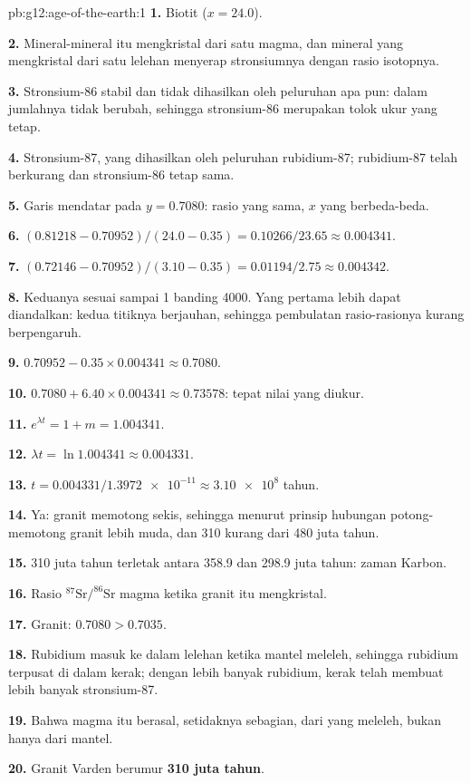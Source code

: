 \begin{solution}{pb:g12:age-of-the-earth:1}
\textbf{1.} Biotit ($x = 24.0$).

\textbf{2.} Mineral-mineral itu mengkristal dari satu magma, dan mineral yang
mengkristal dari satu lelehan menyerap stronsiumnya dengan rasio isotopnya.

\textbf{3.} Stronsium-86 stabil dan tidak dihasilkan oleh peluruhan apa pun:
dalam  jumlahnya tidak berubah, sehingga stronsium-86 merupakan
tolok ukur yang tetap.

\textbf{4.} Stronsium-87, yang dihasilkan oleh peluruhan rubidium-87;
rubidium-87 telah berkurang dan stronsium-86 tetap sama.

\textbf{5.} Garis mendatar pada $y = 0.7080$: rasio yang sama, $x$ yang
berbeda-beda.

\textbf{6.} $(0.81218 - 0.70952)/(24.0 - 0.35) = 0.10266/23.65 \approx
0.004341$.

\textbf{7.} $(0.72146 - 0.70952)/(3.10 - 0.35) = 0.01194/2.75 \approx
0.004342$.

\textbf{8.} Keduanya sesuai sampai 1 banding 4000. Yang pertama lebih dapat
diandalkan: kedua titiknya berjauhan, sehingga pembulatan rasio-rasionya kurang
berpengaruh.

\textbf{9.} $0.70952 - 0.35 \times 0.004341 \approx 0.7080$.

\textbf{10.} $0.7080 + 6.40 \times 0.004341 \approx 0.73578$: tepat nilai
yang diukur.

\textbf{11.} $e^{\lambda t} = 1 + m = 1.004341$.

\textbf{12.} $\lambda t = \ln 1.004341 \approx 0.004331$.

\textbf{13.} $t = 0.004331/\num{1.3972e-11} \approx \num{3.10e8}$ tahun.

\textbf{14.} Ya: granit memotong sekis, sehingga menurut prinsip hubungan
potong-memotong granit lebih muda, dan 310 kurang dari 480 juta tahun.

\textbf{15.} 310 juta tahun terletak antara 358.9 dan 298.9 juta tahun:
zaman Karbon.

\textbf{16.} Rasio $^{87}\mathrm{Sr}/^{86}\mathrm{Sr}$ magma ketika granit itu
mengkristal.

\textbf{17.} Granit: $0.7080 > 0.7035$.

\textbf{18.} Rubidium masuk ke dalam lelehan ketika mantel meleleh, sehingga
rubidium terpusat di dalam kerak; dengan lebih banyak rubidium, kerak telah
membuat lebih banyak stronsium-87.

\textbf{19.} Bahwa magma itu berasal, setidaknya sebagian, dari  yang
meleleh, bukan hanya dari mantel.

\textbf{20.} Granit Varden berumur \textbf{310 juta tahun}.
\end{solution}
